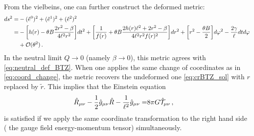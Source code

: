 \documentclass[11pt]{article}
\newcommand{\nn}{\nonumber}
\numberwithin{equation}{section}
\begin{document}
From the vielbeins, one can further construct the deformed metric:
\begin{align}
  ds^2=& -(\hat{e}^0)^2 + (\hat{e}^1)^2 + (\hat{e}^2)^2
\nn\\=&
-\bigg[ h(r) - \theta B\frac{2r^2-\beta}{4\ell^2 r^2} \bigg] dt^2
+ \bigg[\frac{1}{f(r) }
+\theta B \frac{2h(r) \ell^2+2r^2-\beta}{4 \ell^2 r^2 f(r)^2} \bigg] dr^2
+ \bigg[ r^2- \frac{\theta B}{2}  \bigg] d\varphi^2
-\frac{2\gamma}{\ell} dtd\varphi 
\nn\\&
+{\cal O}(\theta^2)
\label{eq:deformed_metric}
 \,.
\end{align}
In the neutral limit $Q\rightarrow 0$ (namely $\beta\rightarrow 0$),
this metric agrees with \eqref{eq:neutral_def_BTZ}.
When one applies the same change of coordinates as in \eqref{eq:coord_change},
the metric recovers the undeformed one
\eqref{eq:crBTZ_sol} with $r$ replaced by $\tilde{r}$.
This implies that the Einstein equation
\begin{align}
  \hat{R}_{\mu\nu} - \frac{1}{2}\hat{g}_{\mu\nu} \hat{R} - \frac{1}{\ell^2} \hat{g}_{\mu\nu}
  =& 8\pi G \hat{\cal T}_{\mu\nu} \,,
\label{eq:Einstein_eq_def1}
\end{align}
is satisfied
if we apply the same coordinate transformation to the right hand side (
the gauge field energy-momentum tensor) simultaneously.
\end{document}
